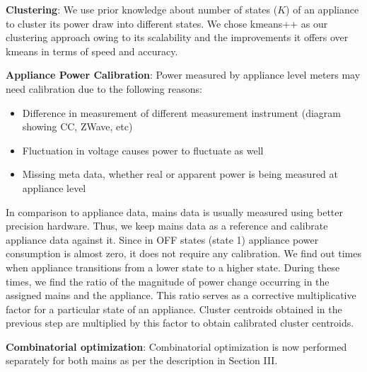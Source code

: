 \documentclass[conference]{IEEEtran}
\begin{document}
\noindent\textbf{Clustering}: We use prior knowledge about number of states ($K$) of an appliance to cluster its power draw into different states. We chose kmeans++\cite{kmeansplusplus} as our clustering approach owing to its scalability and the improvements it offers over kmeans in terms of speed and accuracy.


\noindent\textbf{Appliance Power Calibration}: 
Power measured by appliance level meters may need calibration due to the following reasons:
\begin{itemize}
\item Difference in measurement of different measurement instrument (diagram showing CC, ZWave, etc) \cite{berges2008}
\item Fluctuation in voltage causes power to fluctuate as well
\item Missing meta data, whether real or apparent power is being measured at appliance level

\end{itemize} In comparison to appliance data, mains data is usually measured using better precision hardware. Thus, we keep mains data as a reference and calibrate appliance data against it. Since in OFF states (state 1) appliance power consumption is almost zero, it does not require any calibration. We find out times when appliance transitions from a lower state to a higher state. During these times, we find the ratio of the magnitude of power change occurring in the assigned mains and the appliance. This ratio serves as a corrective multiplicative factor for a particular  state of an appliance. Cluster centroids obtained in the previous step are multiplied by this factor to obtain calibrated cluster centroids.

\noindent\textbf{Combinatorial optimization}: Combinatorial optimization is now performed separately for both mains as per the description in Section III.
\end{document}
